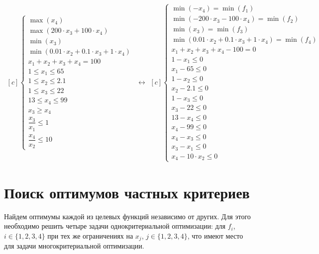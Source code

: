 \begin{equation*}
	\begin{aligned}[c]
		\begin{cases}
		\max(x_4) \\
		\max(200 \cdot x_3 + 100 \cdot x_4) \\
		\min(x_3) \\
		\min(0.01 \cdot x_2 + 0.1 \cdot x_3 + 1 \cdot x_4) \\
		x_1 + x_2 + x_3 + x_4 = 100 \\
		1 \leq x_1 \leq 65 \\
		1 \leq x_2 \leq 2.1 \\
		1 \leq x_3 \leq 22 \\
		13 \leq x_4 \leq 99 \\
		x_3 \geq x_4 \\
		\dfrac{x_3}{x_1} \leq 1 \\
		\dfrac{x_4}{x_2} \leq 10
		\end{cases}
	\end{aligned}
	\leftrightarrow
	\begin{aligned}[c]
		\begin{cases}
		\min(-x_4) = \min(f_1) \\
		\min(-200 \cdot x_3 - 100 \cdot x_4) = \min(f_2) \\
		\min(x_3) = \min(f_3) \\
		\min(0.01 \cdot x_2 + 0.1 \cdot x_3 + 1 \cdot x_4) = \min(f_4) \\
		x_1 + x_2 + x_3 + x_4 - 100 = 0 \\
		1 - x_1 \leq 0 \\
		x_1 - 65 \leq 0 \\
		1 - x_2 \leq 0 \\
		x_2 - 2.1 \leq 0 \\
		1 - x_3 \leq 0 \\
		x_3 - 22 \leq 0 \\
		13 - x_4 \leq 0 \\
		x_4 - 99 \leq 0 \\
		x_4 - x_3 \leq 0 \\
		x_3 - x_1 \leq 0 \\
		x_4 - 10 \cdot x_2 \leq 0
		\end{cases}
	\end{aligned}
\end{equation*}

\section{Поиск оптимумов частных критериев}
Найдем оптимумы каждой из целевых функций независимо от других. Для этого необходимо решить четыре задачи однокритериальной оптимизации: для $f_i$, $i \in \{1,2,3,4\}$ при тех же ограничениях на $x_j$, $j \in \{1, 2, 3, 4\}$, что имеют место для задачи многокритериальной оптимизации.

